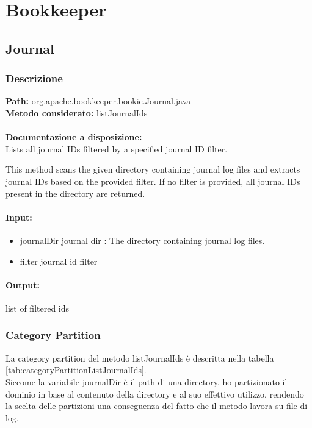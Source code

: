 \documentclass[10pt, a4paper]{article}
\begin{document}
\section{Bookkeeper}
\subsection{Journal}

\subsubsection{Descrizione}
\textbf{Path:} org.apache.bookkeeper.bookie.Journal.java \\
\textbf{Metodo considerato:} listJournalIds \\ \\
\textbf{Documentazione a disposizione:} \\
Lists all journal IDs filtered by a specified journal ID filter.

This method scans the given directory containing journal log files and extracts
journal IDs based on the provided filter. If no filter is provided, all journal
IDs present in the directory are returned.


\paragraph{Input:}
\begin{itemize}
  \item journalDir journal dir : The directory containing journal log files.
  \item filter journal id filter
\end{itemize}
\paragraph{Output:}
    list of filtered ids

\subsubsection{Category Partition}

La category partition del metodo listJournalIds è descritta nella tabella \ref{tab:categoryPartitionListJournalIds}. \\
Siccome la variabile journalDir è il path di una directory, ho partizionato 
il dominio in base al contenuto della directory e al suo effettivo utilizzo, rendendo la scelta delle partizioni 
una conseguenza del fatto che il metodo lavora su file di log.
\end{document}
